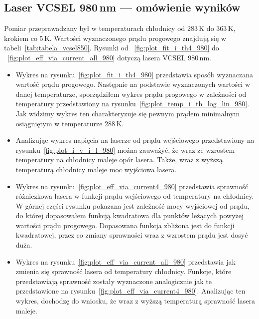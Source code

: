 \subsection{Laser VCSEL 980\,nm --- omówienie wyników}
Pomiar przeprawadzany był w temperaturach chłodnicy od 283\,K do 363\,K, krokiem co 5\,K. Wartości wyznaczonego prądu progowego
znajdują się w tabeli~\ref{tab:tabela_vcsel850}. Rysunki od ~\ref{fig:plot_fit_i_th4_980} do ~\ref{fig:plot_eff_via_current_all_980} dotyczą lasera
VCSEL 980\,nm.
\begin{itemize}
\item Wykres na rysunku~\ref{fig:plot_fit_i_th4_980} przedstawia sposób wyznaczana wartość prądu progowego. Następnie na podstawie
wyznaczonych wartości w danej temperaturze, sporządziłem wykres prądu progowego w zależności od temperatury
przedstawiony na rysunku~\ref{fig:plot_temp_i_th_log_lin_980}. Jak widzimy wykres ten charakteryzuje się pewnym prądem
minimalnym osiągniętym w temperaturze 288\,K.
\item Analizując wykres napięcia na laserze od prądu wejściowego przedstawiony na rysunku~\ref{fig:plot_i_v_i_l_980}
można zauważyć, że wraz ze wzrostem temperatury na chłodnicy
maleje opór lasera. Także, wraz z wyższą temperaturą chłodnicy maleje moc wyjściowa lasera.
\item Wykres na rysunku~\ref{fig:plot_eff_via_current4_980} przedstawia sprawność różniczkowa lasera w funkcji prądu wejściowego
od temperatury na chłodnicy. W górnej części rysunku pokazana jest zależność mocy wyjściowej od prądu, do której dopasowałem
funkcją kwadratowa dla punktów leżących powyżej wartości prądu progowego. Dopasowana funkcja zbliżona jest do funkcji kwadratowej,
przez co zmiany sprawności wraz z wzrostem prądu jest dosyć duża.
\item Wykres na rysunku~\ref{fig:plot_eff_via_current_all_980} przedstawia jak zmienia się sprawność lasera od temperatury chłodnicy.
Funkcje, które przedstawiają sprawność zostały wyznaczone analogicznie jak te przedstawione na rysunku~\ref{fig:plot_eff_via_current4_980}.
Analizując ten wykres, dochodzę do wniosku, że wraz z wyższą temperaturą sprawność lasera maleje.
\end{itemize}
